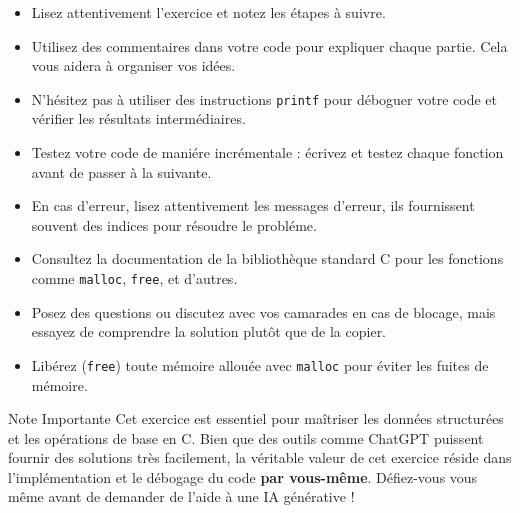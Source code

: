 \begin{howto}{}
\begin{itemize}
    \item Lisez attentivement l'exercice et notez les \'etapes à suivre.
    \item Utilisez des commentaires dans votre code pour expliquer chaque partie. Cela vous aidera à organiser vos id\'ees.
    \item N'h\'esitez pas à utiliser des instructions \texttt{printf} pour d\'eboguer votre code et v\'erifier les r\'esultats interm\'ediaires.
    \item Testez votre code de mani\'ere incr\'ementale : \'ecrivez et testez chaque fonction avant de passer à la suivante.
    \item En cas d'erreur, lisez attentivement les messages d'erreur, ils fournissent souvent des indices pour r\'esoudre le probl\'eme.
    \item Consultez la documentation de la bibliothèque standard C pour les fonctions comme \texttt{malloc}, \texttt{free}, et d'autres.
    \item Posez des questions ou discutez avec vos camarades en cas de blocage, mais essayez de comprendre la solution plut\^ot que de la copier.
    \item Lib\'erez ({\tt free}) toute m\'emoire allou\'ee avec \texttt{malloc} pour \'eviter les fuites de m\'emoire.
\end{itemize}
\end{howto}

\begin{ad}[]{Note Importante}
Cet exercice est essentiel pour ma\^itriser les donn\'ees structur\'ees et les op\'erations de base en C. Bien que des outils comme ChatGPT puissent fournir des solutions très facilement, la v\'eritable valeur de cet exercice r\'eside dans l'impl\'ementation et le d\'ebogage du code {\bf par vous-m\^eme}. D\'efiez-vous vous même avant de demander de l'aide à une IA générative !
\end{ad}

